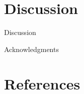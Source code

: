 \documentclass[aps,prd,amsmath,floats,floatfix, twocolumn,
superscriptaddress,nofootinbib,showpacs]{revtex4-1}
\begin{document}
\section{Discussion}
Discussion

\begin{acknowledgments}
Acknowledgments
\end{acknowledgments}

\section*{References}

\end{document}
